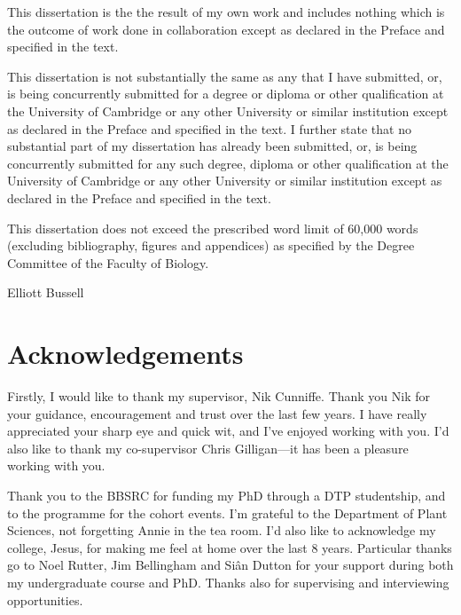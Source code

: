 This dissertation is the the result of my own work and includes nothing which is the outcome
of work done in collaboration except as declared in the Preface and specified in the text.

This dissertation is not substantially the same as any that I have submitted, or, is being
concurrently submitted for a degree or diploma or other qualification at the University of
Cambridge or any other University or similar institution except as declared in the Preface and
specified in the text. I further state that no substantial part of my dissertation has already
been submitted, or, is being concurrently submitted for any such degree, diploma or other
qualification at the University of Cambridge or any other University or similar institution
except as declared in the Preface and specified in the text.

This dissertation does not exceed the prescribed word limit of 60,000 words (excluding
bibliography, figures and appendices) as specified by the Degree Committee of the Faculty
of Biology.

\vspace*{2cm}

Elliott Bussell

\thesisDate
\cleardoublepage

\chapter*{Acknowledgements}
\label{sec:acknowledgements}

Firstly, I would like to thank my supervisor, Nik Cunniffe. Thank you Nik for your guidance, encouragement and trust over the last few years. I have really appreciated your sharp eye and quick wit, and I've enjoyed working with you. I'd also like to thank my co-supervisor Chris Gilligan---it has been a pleasure working with you.

Thank you to the BBSRC for funding my PhD through a DTP studentship, and to the programme for the cohort events. I'm grateful to the Department of Plant Sciences, not forgetting Annie in the tea room. I'd also like to acknowledge my college, Jesus, for making me feel at home over the last 8 years. Particular thanks go to Noel Rutter, Jim Bellingham and Si\^{a}n Dutton for your support during both my undergraduate course and PhD. Thanks also for supervising and interviewing opportunities.

